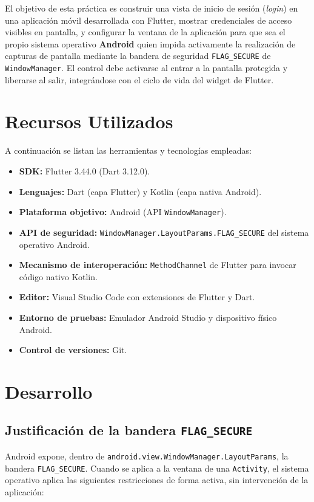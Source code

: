 \documentclass[12pt, a4paper]{article}
\begin{document}
El objetivo de esta práctica es construir una vista de inicio de sesión
(\textit{login}) en una aplicación móvil desarrollada con Flutter, mostrar
credenciales de acceso visibles en pantalla, y configurar la ventana de la
aplicación para que sea el propio sistema operativo \textbf{Android} quien
impida activamente la realización de capturas de pantalla mediante la
bandera de seguridad \texttt{FLAG\_SECURE} de \texttt{WindowManager}. El
control debe activarse al entrar a la pantalla protegida y liberarse al
salir, integrándose con el ciclo de vida del widget de Flutter.

\section{Recursos Utilizados}
\label{sec:recursos}
A continuación se listan las herramientas y tecnologías empleadas:

\begin{itemize}
    \item \textbf{SDK:} Flutter 3.44.0 (Dart 3.12.0).
    \item \textbf{Lenguajes:} Dart (capa Flutter) y Kotlin (capa nativa Android).
    \item \textbf{Plataforma objetivo:} Android (API \texttt{WindowManager}).
    \item \textbf{API de seguridad:} \texttt{WindowManager.LayoutParams.FLAG\_SECURE} del sistema operativo Android.
    \item \textbf{Mecanismo de interoperación:} \texttt{MethodChannel} de Flutter para invocar código nativo Kotlin.
    \item \textbf{Editor:} Visual Studio Code con extensiones de Flutter y Dart.
    \item \textbf{Entorno de pruebas:} Emulador Android Studio y dispositivo físico Android.
    \item \textbf{Control de versiones:} Git.
\end{itemize}

\section{Desarrollo}
\label{sec:desarrollo}

\subsection{Justificación de la bandera \texttt{FLAG\_SECURE}}
Android expone, dentro de \texttt{android.view.WindowManager.LayoutParams},
la bandera \texttt{FLAG\_SECURE}. Cuando se aplica a la ventana de una
\texttt{Activity}, el sistema operativo aplica las siguientes restricciones
de forma activa, sin intervención de la aplicación:
\end{document}
